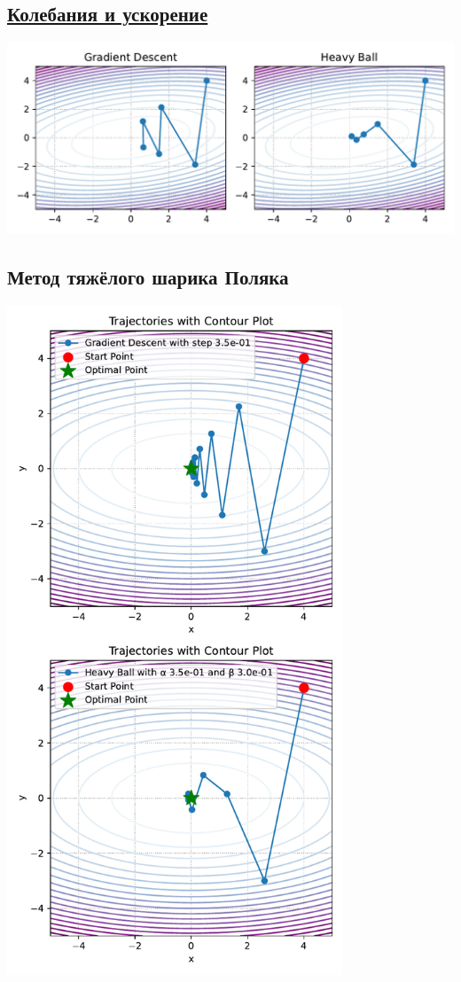 \documentclass[
  russian,
  letterpaper,
  DIV=11,
  numbers=noendperiod]{scrartcl}
\begin{document}
\subsection{\texorpdfstring{\href{https://colab.research.google.com/github/MerkulovDaniil/optim/blob/master/assets/Notebooks/GD.ipynb}{Колебания
и
ускорение}}{Колебания и ускорение}}\label{ux43aux43eux43bux435ux431ux430ux43dux438ux44f-ux438-ux443ux441ux43aux43eux440ux435ux43dux438ux435}

\includegraphics{GD_vs_HB_hor.pdf}

\subsection{Метод тяжёлого шарика
Поляка}\label{ux43cux435ux442ux43eux434-ux442ux44fux436ux451ux43bux43eux433ux43e-ux448ux430ux440ux438ux43aux430-ux43fux43eux43bux44fux43aux430}

\includegraphics[height=20cm]{GD_HB.pdf}
\end{document}
